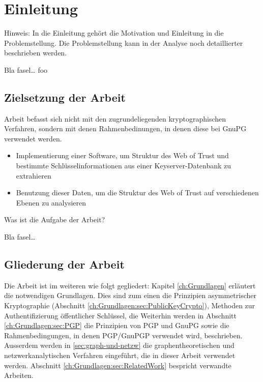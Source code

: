 
\chapter{Einleitung}
\label{ch:Einleitung}
Hinweis: In die Einleitung gehört die Motivation 
und Einleitung in die Problemstellung. Die Problemstellung
kann in der Analyse noch detaillierter beschrieben werden.

Bla fasel\ldots
foo


\section{Zielsetzung der Arbeit}
\label{ch:Einleitung:sec:Zielsetzung}

Arbeit befasst sich nicht mit den zugrundeliegenden kryptographischen
Verfahren, sondern mit denen Rahmenbedinungen, in denen diese bei
GnuPG verwendet werden.

\begin{itemize}
\item Implementierung einer Software, um Struktur des Web of Trust und
  bestimmte Schl\"usselinformationen aus einer Keyserver-Datenbank zu
  extrahieren
\item Benutzung dieser Daten, um die Struktur des Web of Trust auf
  verschiedenen Ebenen zu analysieren
\end{itemize}

Was ist die Aufgabe der Arbeit?

Bla fasel\ldots

\section{Gliederung der Arbeit}
\label{ch:Einleitung:sec:Gliederung}

Die Arbeit ist im weiteren wie folgt gegliedert: Kapitel
\ref{ch:Grundlagen} erl\"autert die notwendigen Grundlagen. Dies sind
zum einen die Prinzipien asymmetrischer Kryptographie (Abschnitt
\ref{ch:Grundlagen:sec:PublicKeyCrypto}), Methoden zur
Authentifizierung \"offentlicher Schl\"ussel, die Weiterhin werden in
Abschnitt \ref{ch:Grundlagen:sec:PGP} die Prinzipien von PGP und GnuPG
sowie die Rahmenbedingungen, in denen PGP/GnuPGP verwendet wird,
beschrieben. Ausserdem werden in \ref{sec:graph-und-netzw} die
graphentheoretischen und netzwerkanalytischen Verfahren eingef\"uhrt,
die in dieser Arbeit verwendet werden. Abschnitt
\ref{ch:Grundlagen:sec:RelatedWork} bespricht verwandte Arbeiten.

